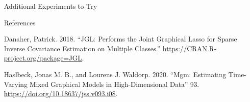 \documentclass[
  ignorenonframetext,
]{beamer}
\newlength{\cslhangindent}
\newlength{\cslentryspacingunit} %
\newenvironment{CSLReferences}[2] %
 {%
  \setlength{\parindent}{0pt}
  \ifodd #1
  \let\oldpar\par
  \def\par{\hangindent=\cslhangindent\oldpar}
  \fi
  \setlength{\parskip}{#2\cslentryspacingunit}
 }%
 {}
\begin{document}
\begin{frame}{Additional Experiments to Try}
\protect\hypertarget{additional-experiments-to-try}{}
\end{frame}

\begin{frame}{References}
\protect\hypertarget{references}{}
\hypertarget{refs}{}
\begin{CSLReferences}{1}{0}
\leavevmode{}%
Danaher, Patrick. 2018. {``JGL: Performs the Joint Graphical Lasso for
Sparse Inverse Covariance Estimation on Multiple Classes.''}
\url{https://CRAN.R-project.org/package=JGL}.

\leavevmode{}%
Haslbeck, Jonas M. B., and Lourens J. Waldorp. 2020.
{``{\textbraceleft}Mgm{\textbraceright}: Estimating Time-Varying Mixed
Graphical Models in High-Dimensional Data''} 93.
\url{https://doi.org/10.18637/jss.v093.i08}.

\end{CSLReferences}
\end{frame}
\end{document}
